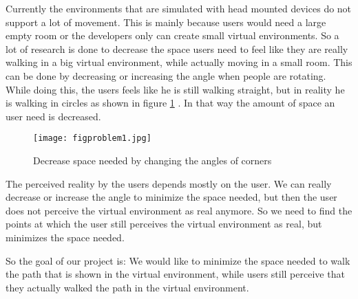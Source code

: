 Currently the environments that are simulated with head mounted devices do not support a lot of movement. This is mainly because users would need a large empty room or the developers only can create small virtual environments. So a lot of research is done to decrease the space users need to feel like they are really walking in a big virtual environment, while actually moving in a small room. This can be done by decreasing or increasing the angle when people are rotating. While doing this, the users feels like he is still walking straight, but in reality he is walking in circles as shown in figure  \ref{figprob1} . In that way the amount of space an user need is decreased. 
\begin{figure}[ht!]
\centering
\texttt{[image: figproblem1.jpg]}
\caption{Decrease space needed by changing the angles of corners \label{figprob1}}
\end{figure}
The perceived reality by the users depends mostly on the user. We can really decrease or increase the angle to minimize the space needed, but then the user does not perceive the virtual environment as real anymore. So we need to find the points at which the user still perceives the virtual environment as real, but minimizes the space needed. 

So the goal of our project is: We would like to minimize the space needed to walk the path that is shown in the virtual environment, while users still perceive that they actually walked the path in the virtual environment.
